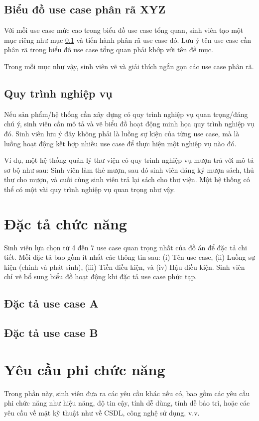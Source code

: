 \documentclass[../DoAn.tex]{subfiles}
\begin{document}
\subsection{Biểu đồ use case phân rã XYZ}
\label{subsection:2.2.2}
Với mỗi use case mức cao trong biểu đồ use case tổng quan, sinh viên tạo một mục riêng như mục \ref{subsection:2.2.2} và tiến hành phân rã use case đó. Lưu ý tên use case cần phân rã trong biểu đồ use case tổng quan phải khớp với tên đề mục.

Trong mỗi mục như vậy, sinh viên vẽ và giải thích ngắn gọn các use case phân rã.

\subsection{Quy trình nghiệp vụ}
\label{subsection:2.2.3}
Nếu sản phẩm/hệ thống cần xây dựng có quy trình nghiệp vụ quan trọng/đáng chú ý, sinh viên cần mô tả và vẽ biểu đồ hoạt động minh họa quy trình nghiệp vụ đó. Sinh viên lưu ý đây không phải là luồng sự kiện của từng use case, mà là luồng hoạt động kết hợp nhiều use case để thực hiện một nghiệp vụ nào đó.

Ví dụ, một hệ thống quản lý thư viện có quy trình nghiệp vụ mượn trả với mô tả sơ bộ như sau: Sinh viên làm thẻ mượn, sau đó sinh viên đăng ký mượn sách, thủ thư cho mượn, và cuối cùng sinh viên trả lại sách cho thư viện. Một hệ thống có thể có một vài quy trình nghiệp vụ quan trọng như vậy.
\section{Đặc tả chức năng}
\label{section:2.3}
Sinh viên lựa chọn từ 4 đến 7 use case quan trọng nhất của đồ án để đặc tả chi tiết. Mỗi đặc tả bao gồm ít nhất các thông tin sau: (i) Tên use case, (ii) Luồng sự kiện (chính và phát sinh), (iii) Tiền điều kiện, và (iv) Hậu điều kiện. Sinh viên chỉ vẽ bổ sung biểu đồ hoạt động khi đặc tả use case phức tạp.
\subsection{Đặc tả use case A}
\hfill
\subsection{Đặc tả use case B}
\hfill

\section{Yêu cầu phi chức năng}
\label{section:2.4}
Trong phần này, sinh viên đưa ra các yêu cầu khác nếu có, bao gồm các yêu cầu phi chức năng như hiệu năng, độ tin cậy, tính dễ dùng, tính dễ bảo trì, hoặc các yêu cầu về mặt kỹ thuật như về CSDL, công nghệ sử dụng, v.v.


\end{document}
